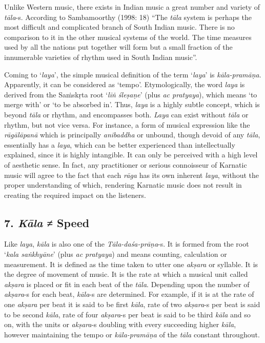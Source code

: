 Unlike Western music, there exists in Indian music a great number and variety of \textit{tāla}-s. According to Sambamoorthy (1998: 18) “The \textit{tāla} system is perhaps the most difficult and complicated branch of South Indian music. There is no comparison to it in the other musical systems of the world. The time measures used by all the nations put together will form but a small fraction of the innumerable varieties of rhythm used in South Indian music”.

Coming to ‘\textit{laya}’, the simple musical definition of the term ‘\textit{laya}’ is \textit{kāla-pramāṇa}. Apparently, it can be considered as ‘tempo’. Etymologically, the word \textit{laya} is derived from the Saṁskṛta root ‘\textit{līṅ śleṣaṇe}’ (plus \textit{ac pratyaya}), which means ‘to merge with’ or ‘to be absorbed in’. Thus, \textit{laya} is a highly subtle concept, which is beyond \textit{tāla} or rhythm, and encompasses both. \textit{Laya} can exist without \textit{tāla} or rhythm, but not vice versa. For instance, a form of musical expression like the \textit{rāgālāpanā} which is principally \textit{anibaddha} or unbound, though devoid of any \textit{tāla}, essentially has a \textit{laya}, which can be better experienced than intellectually explained, since it is highly intangible. It can only be perceived with a high level of aesthetic sense. In fact, any practitioner or serious connoisseur of Karnatic music will agree to the fact that each \textit{rāga} has its own inherent \textit{laya}, without the proper understanding of which, rendering Karnatic music does not result in creating the required impact on the listeners.


\subsection*{7. \textit{Kāla} ≠ Speed}

Like \textit{laya}, \textit{kāla} is also one of the \textit{Tāla-daśa-prāṇa}-s. It is formed from the root ‘\textit{kala saṅkhyāne}’ (plus \textit{ac pratyaya}) and means counting, calculation or measurement. It is defined as the time taken to utter one \textit{akṣara} or syllable. It is the degree of movement of music. It is the rate at which a musical unit called \textit{akṣara} is placed or fit in each beat of the \textit{tāla}. Depending upon the number of \textit{akṣara}-s for each beat, \textit{kāla}-s are determined. For example, if it is at the rate of one \textit{akṣara} per beat it is said to be first \textit{kāla}, rate of two \textit{akṣara}-s per beat is said to be second \textit{kāla}, rate of four \textit{akṣara}-s per beat is said to be third \textit{kāla} and so on, with the units or \textit{akṣara}-s doubling with every succeeding higher \textit{kāla}, however maintaining the tempo or \textit{kāla-pramāṇa} of the \textit{tāla} constant throughout.

